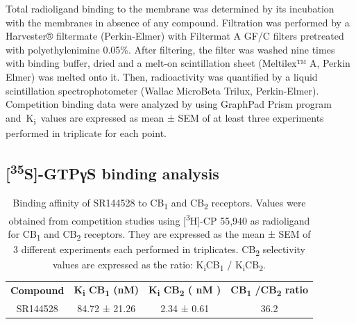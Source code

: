 \documentclass[empirical, authordate]{jote-new-article}
\begin{document}
Total radioligand binding to the membrane was determined by its incubation with the membranes in absence of any compound. Filtration was performed by a Harvester® filtermate (Perkin-Elmer) with Filtermat A GF/C filters pretreated with polyethylenimine 0.05\%. After filtering, the filter was washed nine times with binding buffer, dried and a melt-on scintillation sheet (Meltilex™ A, Perkin Elmer) was melted onto it. Then, radioactivity was quantified by a liquid scintillation spectrophotometer (Wallac MicroBeta Trilux, Perkin-Elmer). Competition binding data were analyzed by using GraphPad Prism program and K\textsubscript{i} values are expressed as mean ± SEM of at least three experiments performed in triplicate for each point.

\subsection{[\textsuperscript{35}S]-GTPγS binding analysis}


\begin{table}[t]

  \begin{fullwidth}
    \caption{Binding affinity of SR144528 to CB\textsubscript{1} and CB\textsubscript{2} receptors. Values were obtained from competition studies using [\textsuperscript{3}H]-CP 55,940 as radioligand for CB\textsubscript{1} and CB\textsubscript{2} receptors. They are expressed as the mean ± SEM of 3 different experiments each performed in triplicates. CB\textsubscript{2 }selectivity values are expressed as the ratio: K\textsubscript{i}CB\textsubscript{1 }/ K\textsubscript{i}CB\textsubscript{2}.
    }
    \label{tab:1}
    \begin{tabular}{c  c  c  c}

      \textbf{Compound} & \textbf{ K\textsubscript{i} CB\textsubscript{1}  (\textbf{nM})} & \textbf{K\textsubscript{i}  CB\textsubscript{2}  ( \textbf{nM}  )} & \textbf{CB\textsubscript{1} /CB\textsubscript{2}  ratio} \\
      SR144528          & 84.72 ± 21.26                                                   & 2.34 ± 0.61                                                        & 36.2                                                     \\
    \end{tabular}
  \end{fullwidth}
\end{table}
\end{document}
